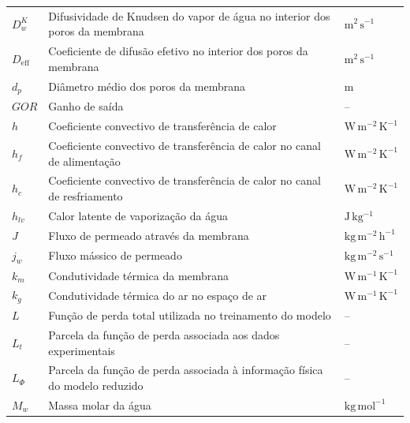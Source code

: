 \begin{longtable}{>{\raggedright\arraybackslash}p{3cm}
                  >{\raggedright\arraybackslash}p{9.5cm}
                  >{\raggedright\arraybackslash}p{3cm}}
$D_w^{K}$ & Difusividade de Knudsen do vapor de água no interior dos poros da membrana & $\mathrm{m^2\,s^{-1}}$ \\

$D_{\mathrm{eff}}$ & Coeficiente de difusão efetivo no interior dos poros da membrana & $\mathrm{m^2\,s^{-1}}$ \\

$d_p$ & Diâmetro médio dos poros da membrana & $\mathrm{m}$ \\

$GOR$ & Ganho de saída & -- \\

$h$ & Coeficiente convectivo de transferência de calor & $\mathrm{W\,m^{-2}\,K^{-1}}$ \\

$h_f$ & Coeficiente convectivo de transferência de calor no canal de alimentação & $\mathrm{W\,m^{-2}\,K^{-1}}$ \\

$h_c$ & Coeficiente convectivo de transferência de calor no canal de resfriamento & $\mathrm{W\,m^{-2}\,K^{-1}}$ \\

$h_{lv}$ & Calor latente de vaporização da água & $\mathrm{J\,kg^{-1}}$ \\

$J$ & Fluxo de permeado através da membrana & $\mathrm{kg\,m^{-2}\,h^{-1}}$ \\

$j_w$ & Fluxo mássico de permeado & $\mathrm{kg\,m^{-2}\,s^{-1}}$ \\

$k_m$ & Condutividade térmica da membrana & $\mathrm{W\,m^{-1}\,K^{-1}}$ \\

$k_g$ & Condutividade térmica do ar no espaço de ar & $\mathrm{W\,m^{-1}\,K^{-1}}$ \\

$L$ & Função de perda total utilizada no treinamento do modelo & -- \\

$L_t$ & Parcela da função de perda associada aos dados experimentais & -- \\

$L_{\Phi}$ & Parcela da função de perda associada à informação física do modelo reduzido & -- \\

$M_w$ & Massa molar da água & $\mathrm{kg\,mol^{-1}}$ \\


\end{longtable}
